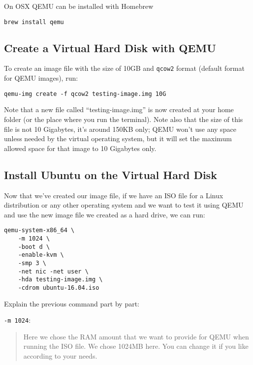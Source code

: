 On OSX QEMU can be installed with Homebrew

\begin{verbatim}
brew install qemu
\end{verbatim}

\hypertarget{create-a-virtual-hard-disk-with-qemu}{%
\subsection{Create a Virtual Hard Disk with
QEMU}\label{create-a-virtual-hard-disk-with-qemu}}

To create an image file with the size of 10GB and \texttt{qcow2} format
(default format for QEMU images), run:

\begin{verbatim}
qemu-img create -f qcow2 testing-image.img 10G
\end{verbatim}

Note that a new file called ``testing-image.img'' is now created at your
home folder (or the place where you run the terminal). Note also that
the size of this file is not 10 Gigabytes, it's around 150KB only; QEMU
won't use any space unless needed by the virtual operating system, but
it will set the maximum allowed space for that image to 10 Gigabytes
only.

\hypertarget{install-ubuntu-on-the-virtual-hard-disk}{%
\subsection{Install Ubuntu on the Virtual Hard
Disk}\label{install-ubuntu-on-the-virtual-hard-disk}}

Now that we've created our image file, if we have an ISO file for a
Linux distribution or any other operating system and we want to test it
using QEMU and use the new image file we created as a hard drive, we can
run:

\begin{verbatim}
qemu-system-x86_64 \
    -m 1024 \
    -boot d \
    -enable-kvm \
    -smp 3 \
    -net nic -net user \
    -hda testing-image.img \
    -cdrom ubuntu-16.04.iso
\end{verbatim}

Explain the previous command part by part:

\texttt{-m\ 1024}:

\begin{quote}
Here we chose the RAM amount that we want to provide for QEMU when
running the ISO file. We chose 1024MB here. You can change it if you
like according to your needs.
\end{quote}

